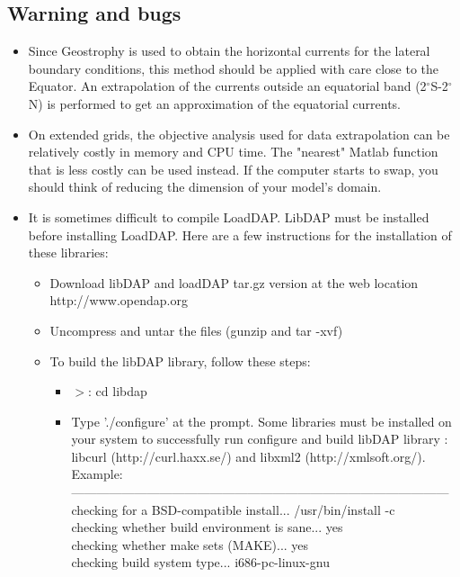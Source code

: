 \subsection{Warning and bugs}
\begin{itemize}
\item Since Geostrophy is used to obtain the horizontal currents for
the lateral boundary conditions, this method should be applied with 
care close to the Equator. An extrapolation of the currents outside 
an equatorial band (2$^\circ$S-2$^\circ$N) is performed to get an 
approximation of the equatorial currents.
\item On extended grids, the objective analysis used for data 
extrapolation can be relatively costly in memory and CPU time. 
The "nearest" Matlab function that is less costly can be used instead.
If the computer starts to swap, you should think of reducing the 
dimension of your model's domain.
\item It is sometimes difficult to compile LoadDAP. 
LibDAP must be installed before installing LoadDAP. 
Here are a few instructions for the installation of these libraries:\\
\begin{itemize}
\item Download libDAP and loadDAP tar.gz version at the web location
http://www.opendap.org
\item Uncompress and untar the files (gunzip and tar -xvf)
\item To build the libDAP library, follow these steps:\\
\begin{itemize}
\item $>$: cd libdap\\
\item Type './configure' at the prompt. Some libraries must be installed 
on your system to successfully run configure and build libDAP library : libcurl 
(http://curl.haxx.se/) and libxml2 (http://xmlsoft.org/).\\
Example:\\
------------------------------------------------------------------------------------------\\
checking for a BSD-compatible install... /usr/bin/install -c\\
checking whether build environment is sane... yes\\
checking whether make sets (MAKE)... yes\\
checking build system type... i686-pc-linux-gnu\\

\end{itemize}
\end{itemize}
\end{itemize}
